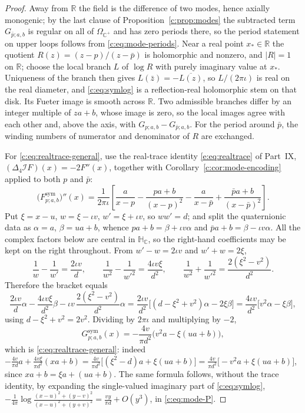 \documentclass[11pt,a4paper]{article}
\numberwithin{equation}{section}
\theoremstyle{definition}
\theoremstyle{remark}
\theoremstyle{plain}
\newcommand{\HC}{\mathbb H_{\mathbb C}}
\newcommand{\RR}{\mathbb R}
\newcommand{\CC}{\mathbb C}
\newcommand{\Cplus}{\CC^{+}}
\newcommand{\lap}{\Delta_4}
\newcommand{\I}{\mathcal I}
\newcommand{\Om}{\Omega}
\newcommand{\abs}[1]{\lvert #1\rvert}
\begin{document}
\begin{proof}
Away from $\RR$ the field is the difference of two modes, hence axially
monogenic; by the last clause of Proposition~\ref{c:prop:modes} the
subtracted term $G_{\bar p;a,b}$ is regular on all of $\Om_{\Cplus}$ and
has zero periods there, so the period statement on upper loops follows
from \eqref{c:eq:mode-periods}.  Near a real point $x_*\in\RR$ the
quotient $R(z)=(z-p)/(z-\bar p)$ is holomorphic and nonzero, and
$\abs{R}=1$ on $\RR$; choose the local branch $L$ of $\log R$ with purely
imaginary value at $x_*$.  Uniqueness of the branch then gives
$L(\bar z)=-\overline{L(z)}$, so $L/(2\pi\iota)$ is real on the real
diameter, and \eqref{c:eq:symlog} is a reflection-real holomorphic stem
on that disk.  Its Fueter image is smooth across $\RR$.  Two admissible
branches differ by an integer multiple of $za+b$, whose image is zero, so
the local images agree with each other and, above the axis, with
$G_{p;a,b}-G_{\bar p;a,b}$.  For the period around $\bar p$, the winding
numbers of numerator and denominator of $R$ are exchanged.

For \eqref{c:eq:realtrace-general}, use the real-trace identity \eqref{e:eq:realtrace} of Part~IX, $(\lap\I F)(x)=-2F''(x)$, together with
Corollary~\ref{c:cor:mode-encoding} applied to both $p$ and $\bar p$:
\[
  \bigl(F^{\mathrm{sym}}_{p;a,b}\bigr)''(x)
  =\frac1{2\pi\iota}\left[\frac{a}{x-p}-\frac{pa+b}{(x-p)^2}
    -\frac{a}{x-\bar p}+\frac{\bar pa+b}{(x-\bar p)^2}\right].
\]
Put $\xi=x-u$, $w=\xi-\iota v$, $w'=\xi+\iota v$, so $ww'=d$; and split
the quaternionic data as $\alpha=a$, $\beta=ua+b$, whence
$pa+b=\beta+\iota v\alpha$ and $\bar pa+b=\beta-\iota v\alpha$.  All the
complex factors below are central in $\HC$, so the right-hand
coefficients may be kept on the right throughout.  From
$w'-w=2\iota v$ and $w'+w=2\xi$,
\[
  \frac1w-\frac1{w'}=\frac{2\iota v}{d},\qquad
  \frac1{w^{2}}-\frac1{w'^{2}}=\frac{4\iota v\xi}{d^{2}},\qquad
  \frac1{w^{2}}+\frac1{w'^{2}}=\frac{2(\xi^{2}-v^{2})}{d^{2}} .
\]
Therefore the bracket equals
\[
  \frac{2\iota v}{d}\alpha
  -\frac{4\iota v\xi}{d^{2}}\beta
  -\iota v\,\frac{2(\xi^{2}-v^{2})}{d^{2}}\alpha
  =\frac{2\iota v}{d^{2}}
   \bigl[(d-\xi^{2}+v^{2})\alpha-2\xi\beta\bigr]
  =\frac{4\iota v}{d^{2}}\bigl[v^{2}\alpha-\xi\beta\bigr],
\]
using $d-\xi^2+v^2=2v^2$.  Dividing by $2\pi\iota$ and multiplying by
$-2$,
\[
  G^{\mathrm{sym}}_{p;a,b}(x)
   =-\frac{4v}{\pi d^{2}}\bigl(v^{2}a-\xi(ua+b)\bigr),
\]
which is \eqref{c:eq:realtrace-general}: indeed
$-\frac{4v}{\pi d}a+\frac{4v\xi}{\pi d^{2}}(xa+b)
 =\frac{4v}{\pi d^{2}}\bigl[(\xi^{2}-d)a+\xi(ua+b)\bigr]
 =\frac{4v}{\pi d^{2}}\bigl[-v^{2}a+\xi(ua+b)\bigr]$,
since $xa+b=\xi a+(ua+b)$.  The same
formula follows, without the trace identity, by expanding the
single-valued imaginary part of \eqref{c:eq:symlog},
$-\tfrac1{4\pi}\log\frac{(x-u)^2+(y-v)^2}{(x-u)^2+(y+v)^2}
 = \tfrac{vy}{\pi d}+O(y^3)$, in \eqref{c:eq:mode-P}.
\end{proof}
\end{document}
